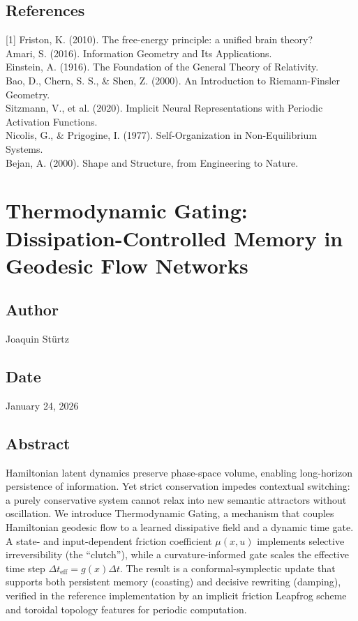 \documentclass{article}
\numberwithin{equation}{section}
\begin{document}
\subsection*{References}
[1] Friston, K. (2010). The free-energy principle: a unified brain theory?\\
[2] Amari, S. (2016). Information Geometry and Its Applications.\\
[3] Einstein, A. (1916). The Foundation of the General Theory of Relativity.\\
[4] Bao, D., Chern, S. S., \& Shen, Z. (2000). An Introduction to Riemann-Finsler Geometry.\\
[5] Sitzmann, V., et al. (2020). Implicit Neural Representations with Periodic Activation Functions.\\
[6] Nicolis, G., \& Prigogine, I. (1977). Self-Organization in Non-Equilibrium Systems.\\
[7] Bejan, A. (2000). Shape and Structure, from Engineering to Nature.

\section{Thermodynamic Gating: Dissipation-Controlled Memory in Geodesic Flow Networks}
\subsection*{Author}
Joaquin Stürtz
\subsection*{Date}
January 24, 2026
\subsection*{Abstract}
Hamiltonian latent dynamics preserve phase-space volume, enabling long-horizon persistence of information. Yet strict conservation impedes contextual switching: a purely conservative system cannot relax into new semantic attractors without oscillation. We introduce Thermodynamic Gating, a mechanism that couples Hamiltonian geodesic flow to a learned dissipative field and a dynamic time gate. A state- and input-dependent friction coefficient $\mu(x,u)$ implements selective irreversibility (the ``clutch''), while a curvature-informed gate scales the effective time step $\Delta t_{\text{eff}} = g(x)\Delta t$. The result is a conformal-symplectic update that supports both persistent memory (coasting) and decisive rewriting (damping), verified in the reference implementation by an implicit friction Leapfrog scheme and toroidal topology features for periodic computation.
\end{document}
